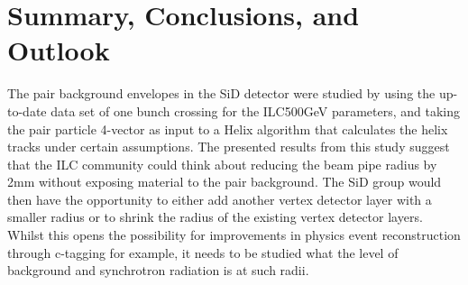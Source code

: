 \section{Summary, Conclusions, and Outlook}
The pair background envelopes in the SiD detector were studied by using the up-to-date \guineapig data set of one bunch crossing for the ILC500GeV parameters, and taking the pair particle 4-vector as input to a Helix algorithm that calculates the helix tracks under certain assumptions.
The presented results from this study suggest that the ILC community could think about reducing the beam pipe radius by \unit{2}{mm} without exposing material to the pair background.
The SiD group would then have the opportunity to either add another vertex detector layer with a smaller radius or to shrink the radius of the existing vertex detector layers.
Whilst this opens the possibility for improvements in physics event reconstruction through c-tagging for example, it needs to be studied what the level of background and synchrotron radiation is at such
radii.
